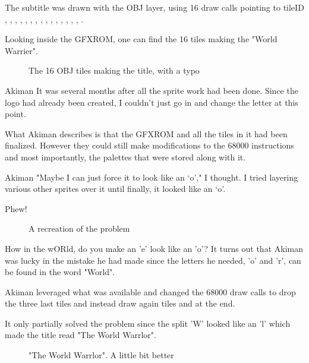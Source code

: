 The subtitle was drawn with the OBJ layer, using 16 draw calls pointing to tileID , , , , , , , , , , , , , , , . 

Looking inside the GFXROM, one can find the 16 tiles making the "World Warrier". 

\begin{figure}[H]
 \caption*{The 16 OBJ tiles making the title, with a typo}%
 \end{figure}%

\begin{q}{Akiman}
It was several months after all the sprite work had been done. Since the logo had already been created, I couldn't just go in and change the letter at this point.
\end{q}

What Akiman describes is that the GFXROM and all the tiles in it had been finalized. However they could still make modifications to the 68000 instructions and most importantly, the palettes that were stored along with it.

\begin{q}{Akiman}
"Maybe I can just force it to look like an ‘o’," I thought. I tried layering various other sprites over it until finally, it looked like an ‘o’. 

Phew!
\end{q}

\begin{figure}[H]
 \caption*{A recreation of the problem}%
 \end{figure}%



How in the wORld, do you make an 'e' look like an 'o'? It turns out that Akiman was lucky in the mistake he had made since the letters he needed, 'o' and 'r', can be found in the word "World".

Akiman leveraged what was available and changed the 68000 draw calls to drop the three last tiles and instead draw again tiles  and  at the end.

It only partially solved the problem since the split 'W' looked like an 'l' which made the title read "The World Warrlor". 

\begin{figure}[H]
 \caption*{"The World Warrlor". A little bit better}%
 \end{figure}%


